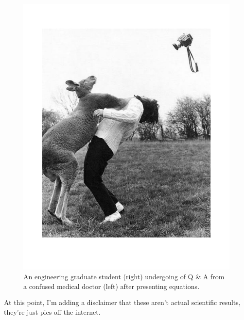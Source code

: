 \documentclass[final]{beamer}
\begin{document}
\begin{frame}[plain]{}
\begin{center}
\begin{minipage}[t]{.23\linewidth}
	{\Large {}}\\
	  \begin{figure} \def\figurename{Fig.} 
	    \centering
	    \includegraphics[width=\textwidth, trim=0 40 40 40, clip]{./figs/kangaroo} \vspace*{-2.0cm}
	    \caption{\normalsize An engineering graduate student (right) undergoing of Q \& A from a confused medical doctor (left) after presenting equations.}
	    \label{fig:Bubex}
	  \end{figure}
At this point, I'm adding a disclaimer that these aren't actual scientific results, they're just pics off the internet.
	    \begin{figure} \def\figurename{Fig.}
	    \centering

\end{figure}
\end{minipage}
\end{center}
\end{frame}
\end{document}
